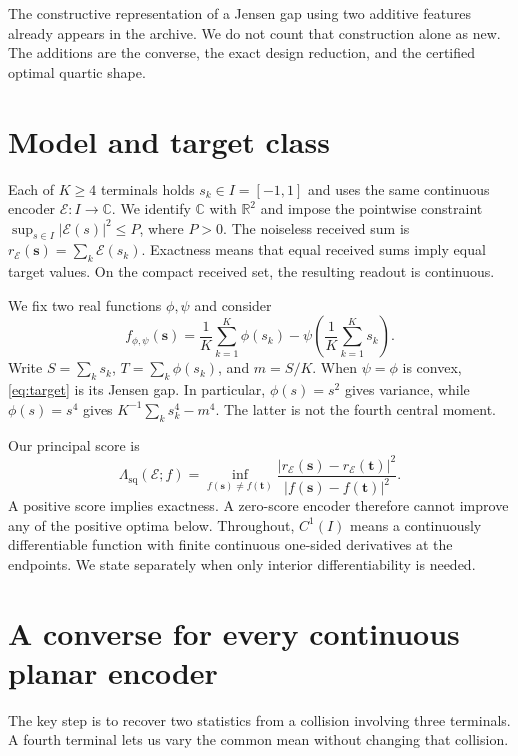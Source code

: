 \documentclass[11pt,letterpaper]{article}
\theoremstyle{remark}
\newcommand{\enc}{\mathscr E}
\newcommand{\R}{\mathbb R}
\newcommand{\C}{\mathbb C}
\newcommand{\sq}{\mathrm{sq}}
\begin{document}
The constructive representation of a Jensen gap using two additive features already appears in the archive. We do not count that construction alone as new. The additions are the converse, the exact design reduction, and the certified optimal quartic shape.

\section{Model and target class}
Each of $K\ge4$ terminals holds $s_k\in I=[-1,1]$ and uses the same continuous encoder $\enc:I\to\C$. We identify $\C$ with $\R^2$ and impose the pointwise constraint $\sup_{s\in I}|\enc(s)|^2\le P$, where $P>0$. The noiseless received sum is $r_\enc(\mathbf s)=\sum_k\enc(s_k)$. Exactness means that equal received sums imply equal target values. On the compact received set, the resulting readout is continuous.

We fix two real functions $\phi,\psi$ and consider
\begin{equation}
 f_{\phi,\psi}(\mathbf s)
 =\frac1K\sum_{k=1}^K\phi(s_k)
   -\psi\!\left(\frac1K\sum_{k=1}^Ks_k\right).
 \label{eq:target}
\end{equation}
Write $S=\sum_k s_k$, $T=\sum_k\phi(s_k)$, and $m=S/K$. When $\psi=\phi$ is convex, \eqref{eq:target} is its Jensen gap. In particular, $\phi(s)=s^2$ gives variance, while $\phi(s)=s^4$ gives $K^{-1}\sum_k s_k^4-m^4$. The latter is not the fourth central moment.

Our principal score is
\begin{equation}
 \Lambda_{\sq}(\enc;f)
 =\inf_{f(\mathbf s)\ne f(\mathbf t)}
 \frac{|r_\enc(\mathbf s)-r_\enc(\mathbf t)|^2}
 {|f(\mathbf s)-f(\mathbf t)|^2}.
 \label{eq:score}
\end{equation}
A positive score implies exactness. A zero-score encoder therefore cannot improve any of the positive optima below. Throughout, $C^1(I)$ means a continuously differentiable function with finite continuous one-sided derivatives at the endpoints. We state separately when only interior differentiability is needed.

\section{A converse for every continuous planar encoder}
The key step is to recover two statistics from a collision involving three terminals. A fourth terminal lets us vary the common mean without changing that collision.
\end{document}

